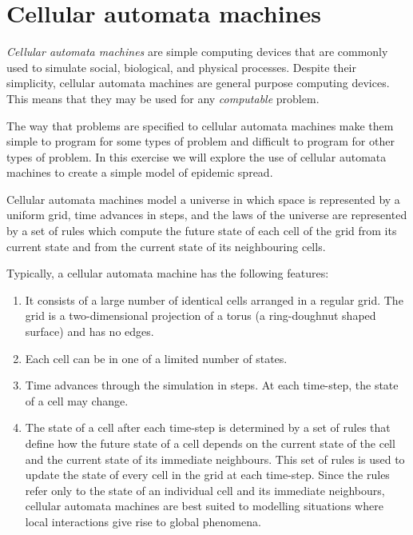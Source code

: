 \documentclass[
  12pt,
  a4paper]{book}
\begin{document}
\hypertarget{cellular-automata-machines}{%
\section{Cellular automata machines}\label{cellular-automata-machines}}

\emph{Cellular automata machines} are simple computing devices that are commonly used to simulate social, biological, and physical processes. Despite their simplicity, cellular automata machines are general purpose computing devices. This means that they may be used for any \emph{computable} problem.

The way that problems are specified to cellular automata machines make them simple to program for some types of problem and difficult to program for other types of problem. In this exercise we will explore the use of cellular automata machines to create a simple model of epidemic spread.

Cellular automata machines model a universe in which space is represented by a uniform grid, time advances in steps, and the laws of the universe are represented by a set of rules which compute the future state of each cell of the grid from its current state and from the current state of its neighbouring cells.

Typically, a cellular automata machine has the following features:

\begin{enumerate}
\def\labelenumi{\arabic{enumi}.}
\item
  It consists of a large number of identical cells arranged in a regular grid. The grid is a two-dimensional projection of a torus (a ring-doughnut shaped surface) and has no edges.
\item
  Each cell can be in one of a limited number of states.
\item
  Time advances through the simulation in steps. At each time-step, the state of a cell may change.
\item
  The state of a cell after each time-step is determined by a set of rules that define how the future state of a cell depends on the current state of the cell and the current state of its immediate neighbours. This set of rules is used to update the state of every cell in the grid at each time-step. Since the rules refer only to the state of an individual cell and its immediate neighbours, cellular automata machines are best suited to modelling situations where local interactions give rise to global phenomena.
\end{enumerate}
\end{document}
